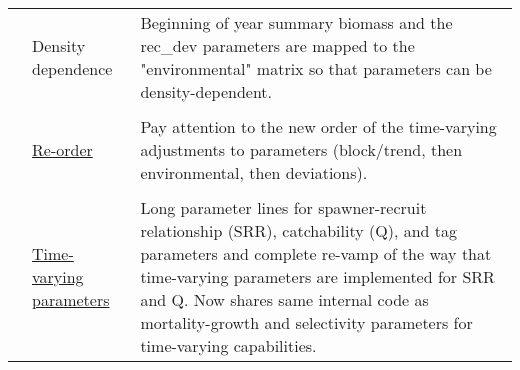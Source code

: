 \documentclass[12pt]{article}
\begin{document}
\begin{center}
\begin{longtable}{p{2cm} p{3cm} p{10cm}}
	\\
	& Density dependence & 
	Beginning of year summary biomass and the rec\_dev parameters are mapped to the "environmental" matrix so that parameters can be density-dependent.\\
	\\						
	& \hyperlink{tvOrder}{Re-order} & 
	Pay attention to the new order of the time-varying adjustments to parameters (block/trend, then environmental, then deviations). \\
	\\						
	& \hyperlink{time-vary}{Time-varying parameters} & 
	Long parameter lines for spawner-recruit relationship (SRR), catchability (Q), and tag parameters and complete re-vamp of the way that time-varying parameters are implemented for SRR and Q.  Now shares same internal code as mortality-growth and selectivity parameters for time-varying capabilities.\\
	\hline	
	\end{longtable}
\end{center}


%		
%		
%		
		
		
\end{document}
